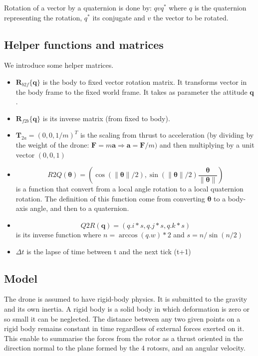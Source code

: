 \documentclass[]{article}
\providecommand{\tightlist}{%
  \setlength{\itemsep}{0pt}\setlength{\parskip}{0pt}}
\begin{document}
Rotation of a vector by a quaternion is done by: \(q v q^*\) where \(q\)
is the quaternion representing the rotation, \(q^*\) its conjugate and
\(v\) the vector to be rotated.

\subsection{Helper functions and
matrices}\label{helper-functions-and-matrices}

We introduce some helper matrices.

\begin{itemize}
\tightlist
\item
  \(\mathbf{R}_{b2f}\{\mathbf{q}\}\) is the body to fixed vector
  rotation matrix. It transforms vector in the body frame to the fixed
  world frame. It takes as parameter the attitude \(\mathbf{q}\).
\item
  \(\mathbf{R}_{f2b}\{\mathbf{q}\}\) is its inverse matrix (from fixed
  to body).
\item
  \(\mathbf{T}_{2a} = (0, 0, 1/m)^T\) is the scaling from thrust to
  acceleration (by dividing by the weight of the drone:
  \(\mathbf{F} = m\mathbf{a} \Rightarrow \mathbf{a} = \mathbf{F}/m)\)
  and then multiplying by a unit vector \((0, 0, 1)\)
\item
  \[R2Q(\boldsymbol{\theta}) = (\cos(\| \boldsymbol{\theta} \| / 2), \sin(\| \boldsymbol{\theta} \| / 2) \frac{\boldsymbol{\theta}}{\| \boldsymbol{\theta} \|} )\]
  is a function that convert from a local angle rotation to a local
  quaternion rotation. The definition of this function come from
  converting \(\boldsymbol{\theta}\) to a body-axis angle, and then to a
  quaternion.
\item
  \[Q2R(\mathbf{q}) = (q.i*s, q.j*s, q.k*s) \] is its inverse function
  where \(n = \arccos(q.w)*2\) and \(s = n/\sin(n/2)\)
\item
  \(\Delta t\) is the lapse of time between t and the next tick (t+1)
\end{itemize}

\subsection{Model}\label{model}

The drone is assumed to have rigid-body physics. It is submitted to the
gravity and its own inertia. A rigid body is a solid body in which
deformation is zero or so small it can be neglected. The distance
between any two given points on a rigid body remains constant in time
regardless of external forces exerted on it. This enable to summarise
the forces from the rotor as a thrust oriented in the direction normal
to the plane formed by the 4 rotosrs, and an angular velocity.
\end{document}
